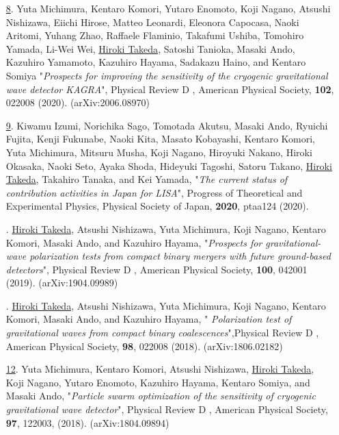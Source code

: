 \documentclass[uplatex, 12pt]{article}
\newcommand{\ctext}[1]{\ooalign{
\hfil\resizebox{\width}{\height}{#1}\hfil
\crcr
\raise.2mm\hbox{\large$\bigcirc$}}}
\begin{document}
\begin{enumerate}
\item[\uline{8}.] Yuta Michimura, Kentaro Komori, Yutaro Enomoto, Koji Nagano, Atsushi Nishizawa, Eiichi Hirose, Matteo Leonardi, Eleonora Capocasa, Naoki Aritomi, Yuhang Zhao, Raffaele Flaminio, Takafumi Ushiba, Tomohiro Yamada, Li-Wei Wei, \uline{Hiroki Takeda}, Satoshi Tanioka, Masaki Ando, Kazuhiro Yamamoto, Kazuhiro Hayama, Sadakazu Haino, and Kentaro Somiya "\emph{Prospects for improving the sensitivity of the cryogenic gravitational wave detector KAGRA}", Physical Review D , American Physical Society, {\bf 102}, 022008 (2020). (arXiv:2006.08970)\\

\item[\uline{9}.] Kiwamu Izumi, Norichika Sago, Tomotada Akutsu, Masaki Ando, Ryuichi Fujita, Kenji Fukunabe, Naoki Kita, Masato Kobayashi, Kentaro Komori, Yuta Michimura, Mitsuru Musha, Koji Nagano, Hiroyuki Nakano, Hiroki Okasaka, Naoki Seto, Ayaka Shoda, Hideyuki Tagoshi, Satoru Takano, \uline{Hiroki Takeda}, Takahiro Tanaka, and Kei Yamada, "\emph{The current status of contribution activities in Japan for LISA}", Progress of Theoretical and Experimental Physics, Physical Society of Japan, {\bf 2020}, ptaa124 (2020).\\

\item[\uline{\ctext{10}}.] \uline{Hiroki Takeda}, Atsushi Nishizawa, Yuta Michimura, Koji Nagano, Kentaro Komori, Masaki Ando, and Kazuhiro Hayama, "\emph{Prospects for gravitational-wave polarization tests from compact binary mergers with future ground-based detectors}", Physical Review D , American Physical Society, {\bf 100}, 042001 (2019). (arXiv:1904.09989)\\

\item[\uline{\ctext{11}}.] \uline{Hiroki Takeda}, Atsushi Nishizawa, Yuta Michimura, Koji Nagano, Kentaro Komori, Masaki Ando, and Kazuhiro Hayama, " \emph{Polarization test of gravitational waves from compact binary coalescences}",Physical Review D , American Physical Society, {\bf 98}, 022008 (2018). (arXiv:1806.02182)\\

\item[\uline{12}.] Yuta Michimura, Kentaro Komori, Atsushi Nishizawa, \uline{Hiroki Takeda}, Koji Nagano, Yutaro Enomoto, Kazuhiro Hayama, Kentaro Somiya, and Masaki Ando, "\emph{Particle swarm optimization of the sensitivity of cryogenic gravitational wave detector}", Physical Review D , American Physical Society, {\bf 97}, 122003, (2018). (arXiv:1804.09894)\\


\end{enumerate}
\end{document}
